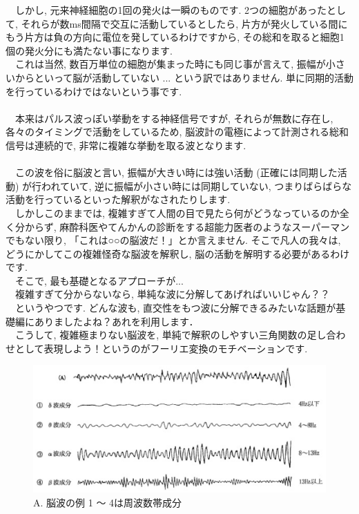 \documentclass[11pt,a4paper]{ujreport} 	%
\begin{document}
　しかし, 元来神経細胞の1回の発火は一瞬のものです. 2つの細胞があったとして, それらが数ms間隔で交互に活動しているとしたら, 片方が発火している間にもう片方は負の方向に電位を発しているわけですから, その総和を取ると細胞1個の発火分にも満たない事になります. \\
　これは当然, 数百万単位の細胞が集まった時にも同じ事が言えて, 振幅が小さいからといって脳が活動していない ... という訳ではありません. 単に同期的活動を行っているわけではないという事です.\\
\\
　本来はパルス波っぽい挙動をする神経信号ですが, それらが無数に存在し, 各々のタイミングで活動をしているため, 脳波計の電極によって計測される総和信号は連続的で, 非常に複雑な挙動を取る波となります. \\
\\
　この波を俗に脳波と言い, 振幅が大きい時には強い活動 (正確には同期した活動) が行われていて, 逆に振幅が小さい時には同期していない, つまりばらばらな活動を行っているといった解釈がなされたりします. \\
　しかしこのままでは, 複雑すぎて人間の目で見たら何がどうなっているのか全く分からず, 麻酔科医やてんかんの診断をする超能力医者のようなスーパーマンでもない限り, 「これは○○の脳波だ！」とか言えません. そこで凡人の我々は, どうにかしてこの複雑怪奇な脳波を解釈し, 脳の活動を解明する必要があるわけです.\\

　そこで, 最も基礎となるアプローチが...\\
　複雑すぎて分からないなら, 単純な波に分解してあげればいいじゃん？？\\ 
　というやつです. どんな波も, 直交性をもつ波に分解できるみたいな話題が基礎編にありましたよね？あれを利用します．
\\
　こうして, 複雑極まりない脳波を, 単純で解釈のしやすい三角関数の足し合わせとして表現しよう！というのがフーリエ変換のモチベーションです.\\

\begin{figure}[H]
\label{im:eeg}
  \centering
  \includegraphics[width=12cm]{../figures/eeg.eps}
  \caption{A. 脳波の例 1 ～ 4は周波数帯成分}
\end{figure}
\end{document}
